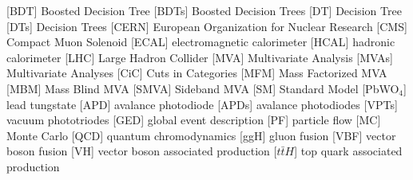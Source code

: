 \begin{acronym}[AAAAAA]
 [BDT] {Boosted Decision Tree}
 [BDTs] {Boosted Decision Trees}
 [DT] {Decision Tree}
 [DTs] {Decision Trees}
 [CERN] {European Organization for Nuclear Research}
 [CMS] {Compact Muon Solenoid}
 [ECAL] {electromagnetic calorimeter}
 [HCAL] {hadronic calorimeter}
 [LHC] {Large Hadron Collider}
 [MVA] {Multivariate Analysis}
 [MVAs] {Multivariate Analyses}
 [CiC] {Cuts in Categories}
 [MFM] {Mass Factorized MVA}
 [MBM] {Mass Blind MVA}
 [SMVA] {Sideband MVA}
 [SM] {Standard Model}
 [PbWO$_{4}$] {lead tungstate}
 [APD] {avalance photodiode}
 [APDs] {avalance photodiodes}
 [VPTs] {vacuum phototriodes}
 [GED] {global event description}
 [PF] {particle flow}
 [MC] {Monte Carlo}
 [QCD] {quantum chromodynamics}
 [ggH] {gluon fusion}
 [VBF] {vector boson fusion}
 [VH] {vector boson associated production}
 [$t\bar{t}H$] {top quark associated production}
\end{acronym}



